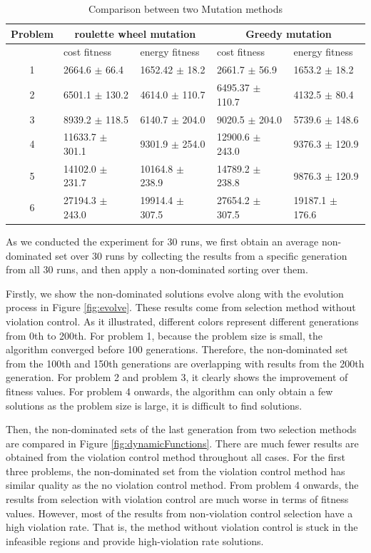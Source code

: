\begin{table}[!ht]
\centering
\caption{Comparison between two Mutation methods}
\label{tab:mutations}
\begin{tabular}{@{}cllll@{}}
\toprule
Problem & \multicolumn{2}{c}{roulette wheel mutation} & \multicolumn{2}{c}{Greedy mutation}   \\ \midrule
        & cost fitness         & energy fitness       & cost fitness      & energy fitness    \\
1       & 2664.6 $\pm$ 66.4      & 1652.42 $\pm$ 18.2     & 2661.7 $\pm$ 56.9   & 1653.2 $\pm$ 18.2   \\
2       & 6501.1 $\pm$ 130.2     & 4614.0 $\pm$ 110.7     & 6495.37 $\pm$ 110.7 & 4132.5 $\pm$ 80.4   \\
3       & 8939.2 $\pm$ 118.5     & 6140.7 $\pm$ 204.0     & 9020.5 $\pm$ 204.0  & 5739.6 $\pm$ 148.6  \\
4       & 11633.7 $\pm$ 301.1    & 9301.9 $\pm$ 254.0     & 12900.6 $\pm$ 243.0 & 9376.3 $\pm$ 120.9  \\
5       & 14102.0 $\pm$ 231.7    & 10164.8 $\pm$ 238.9    & 14789.2 $\pm$ 238.8 & 9876.3 $\pm$ 120.9  \\
6       & 27194.3 $\pm$ 243.0    & 19914.4 $\pm$ 307.5    & 27654.2 $\pm$ 307.5 & 19187.1 $\pm$ 176.6 \\ \bottomrule
\end{tabular}
\end{table}

As we conducted the experiment for 30 runs, we first obtain an average non-dominated set over 30 runs by collecting the results from a specific generation from all 30 runs, and then apply a non-dominated sorting over them.

Firstly, we show the non-dominated solutions evolve along with the evolution process in Figure \ref{fig:evolve}.
These results come from selection method without violation control. 
As it illustrated, different colors represent different generations from 0th to 200th. 
For problem 1, because the problem size is small, the algorithm converged before 100 generations. Therefore, the non-dominated set from the 100th and 150th generations are overlapping with results from the 200th generation. For problem 2 and problem 3, it clearly shows the improvement of fitness values. For problem 4 onwards, the algorithm can only obtain a few solutions as the problem size is large, it is difficult to find solutions.

Then, the non-dominated sets of the last generation from two selection methods are compared in Figure \ref{fig:dynamicFunctions}. There are much fewer results are obtained from the violation control method throughout all cases. For the first three problems, the non-dominated set from the violation control method has similar quality
as the no violation control method. From problem 4 onwards, the results from selection with violation control are much worse in terms of fitness values. However, most of the results from non-violation control selection have a high violation rate. That is, the method without violation control is stuck in the infeasible regions and provide high-violation rate solutions. 

